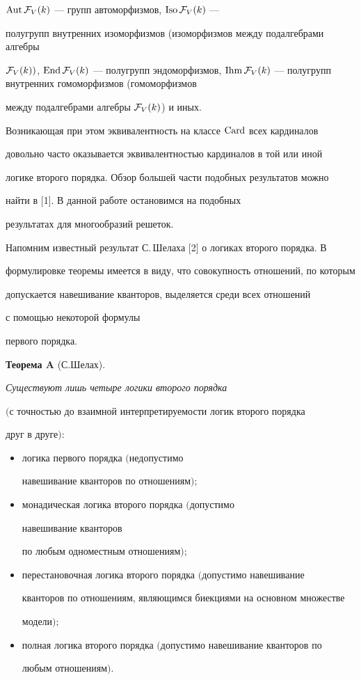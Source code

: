 $\operatorname{Aut}{\cal F}_V(k)$ --- групп автоморфизмов, $\operatorname{Iso}{\cal F}_V(k)$ ---


полугрупп внутренних изоморфизмов (изоморфизмов между подалгебрами алгебры


${\cal F}_V(k))$, $\End{\cal F}_V(k)$ --- полугрупп эндоморфизмов, $\Ihm


{\cal F}_V(k)$ --- полугрупп внутренних гомоморфизмов (гомоморфизмов


между подалгебрами алгебры ${\cal F}_V(k)$) и иных.


Возникающая при этом эквивалентность на классе $\operatorname{Card}$ всех кардиналов


довольно часто оказывается эквивалентностью кардиналов в той или иной


логике второго порядка. Обзор большей части подобных результатов можно


найти в [1]. В данной работе остановимся на подобных 


результатах для многообразий решеток.





Напомним известный результат С.\,Шелаха [2] о логиках второго порядка. В 


формулировке теоремы имеется в виду, что совокупность отношений, по которым


допускается навешивание кванторов, выделяется среди всех отношений


с помощью некоторой формулы


первого порядка.


\medskip





{\bf Теорема A} (С.Шелах). {\it Существуют лишь четыре логики второго порядка 


$($с точностью до взаимной интерпретируемости логик второго порядка


друг в друге$):$


\begin{itemize}


\item[1)] логика первого порядка $($недопустимо 


навешивание кванторов по отношениям$);$


\item[2)] монадическая логика второго порядка $($допустимо


навешивание кванторов


по любым одноместным отношениям$);$


\item[3)] перестановочная логика второго порядка $($допустимо навешивание


кванторов по отношениям, являющимся биекциями на основном множестве


модели$);$


\item[4)] полная логика второго порядка $($допустимо навешивание кванторов по


любым от\-но\-ше\-ниям$)$.


\end{itemize}


}


